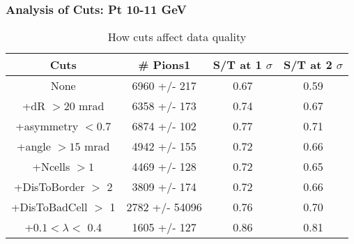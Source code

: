 \frame
{
\frametitle{Analysis of Cuts: Pt 10-11 GeV}
\begin{table}
\caption{How cuts affect data quality}
\centering
\begin{tabular}{c c c c}
\hline\hline
Cuts & \# Pions1 & S/T at 1 $\sigma$ & S/T at 2 $\sigma$ \\ [0.5ex]
\hline
None & 6960 +/-  217 & 0.67 & 0.59 \\ %
+dR $> 20$ mrad & 6358 +/-  173 & 0.74 & 0.67 \\ %
+asymmetry $< 0.7$ & 6874 +/-  102 & 0.77 & 0.71 \\ %
+angle $> 15$ mrad & 4942 +/-  155 & 0.72 & 0.66 \\ %
+Ncells $> 1$& 4469 +/-  128 & 0.72 & 0.65 \\ %
+DisToBorder $>$ 2 & 3809 +/-  174 & 0.72 & 0.66 \\ %
+DisToBadCell $>$ 1& 2782 +/- 54096 & 0.76 & 0.70 \\ %
+$0.1 < \lambda <$ 0.4 & 1605 +/-  127 & 0.86 & 0.81 \\ %
[1ex]
\hline
\end{tabular}
\label{table:nonlin}
\end{table}
}
